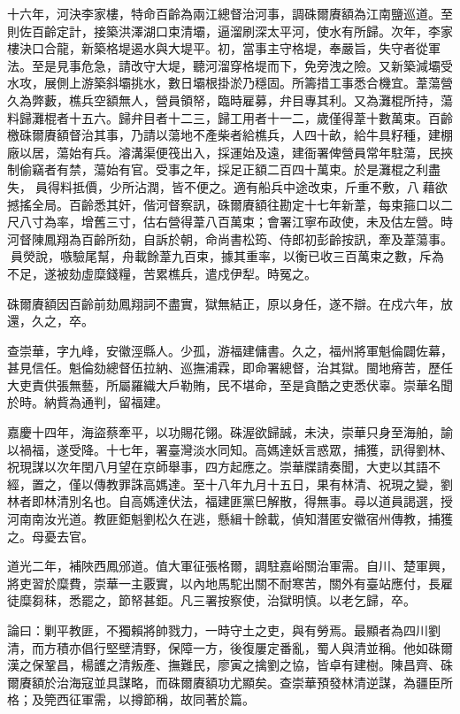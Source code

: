 \begin{pinyinscope}
十六年，河決李家樓，特命百齡為兩江總督治河事，調硃爾賡額為江南鹽巡道。至則佐百齡定計，接築洪澤湖口束清壩，逼溜刷深太平河，使水有所歸。次年，李家樓決口合龍，新築格堤遏水與大堤平。初，當事主守格堤，奉嚴旨，失守者從軍法。至是見事危急，請改守大堤，聽河溜穿格堤而下，免旁洩之險。又新築減壩受水攻，展側上游築斜壩挑水，數日壩根掛淤乃穩固。所籌措工事悉合機宜。葦蕩營久為弊藪，樵兵空額無人，營員領帑，臨時雇募，弁目專其利。又為灘棍所持，蕩料歸灘棍者十五六。歸弁目者十二三，歸工用者十一二，歲僅得葦十數萬束。百齡檄硃爾賡額督治其事，乃請以蕩地不產柴者給樵兵，人四十畝，給牛具籽種，建棚廠以居，蕩始有兵。濬溝渠便筏出入，採運始及遠，建衙署俾營員常年駐蕩，民挾制偷竊者有禁，蕩始有官。受事之年，採足正額二百四十萬束。於是灘棍之利盡失，員得料抵價，少所沾潤，皆不便之。適有船兵中途改束，斤重不敷，八藉欲撼搖全局。百齡悉其奸，偕河督察訊，硃爾賡額往勘定十七年新葦，每束箍口以二尺八寸為率，增舊三寸，估右營得葦八百萬束；會署江寧布政使，未及估左營。時河督陳鳳翔為百齡所劾，自訴於朝，命尚書松筠、侍郎初彭齡按訊，牽及葦蕩事。員熒說，嗾驗尾幫，舟載餘葦九百束，據其重率，以衡已收三百萬束之數，斥為不足，遂被劾虛糜錢糧，苦累樵兵，遣戍伊犁。時冤之。

硃爾賡額因百齡前劾鳳翔詞不盡實，獄無結正，原以身任，遂不辯。在戍六年，放還，久之，卒。

查崇華，字九峰，安徽涇縣人。少孤，游福建傭書。久之，福州將軍魁倫闢佐幕，甚見信任。魁倫劾總督伍拉納、巡撫浦霖，即命署總督，治其獄。閩地瘠苦，歷任大吏責供張無藝，所屬羅織大戶勒賄，民不堪命，至是貪酷之吏悉伏辜。崇華名聞於時。納貲為通判，留福建。

嘉慶十四年，海盜蔡牽平，以功賜花翎。硃渥欲歸誠，未決，崇華只身至海舶，諭以禍福，遂受降。十七年，署臺灣淡水同知。高媽達妖言惑眾，捕獲，訊得劉林、祝現謀以次年閏八月望在京師舉事，四方起應之。崇華牒請奏聞，大吏以其語不經，置之，僅以傳教罪誅高媽達。至十八年九月十五日，果有林清、祝現之變，劉林者即林清別名也。自高媽達伏法，福建匪黨巳解散，得無事。尋以道員謁選，授河南南汝光道。教匪鉅魁劉松久在逃，懸緝十餘載，偵知潛匿安徽宿州傳教，捕獲之。母憂去官。

道光二年，補陜西鳳邠道。值大軍征張格爾，調駐嘉峪關治軍需。自川、楚軍興，將吏習於糜費，崇華一主覈實，以內地馬駝出關不耐寒苦，關外有臺站應付，長雇徒糜芻秣，悉罷之，節帑甚鉅。凡三署按察使，治獄明慎。以老乞歸，卒。

論曰：剿平教匪，不獨賴將帥戮力，一時守土之吏，與有勞焉。最顯者為四川劉清，而方積亦倡行堅壁清野，保障一方，後復屢定番亂，蜀人與清並稱。他如硃爾漢之保鞏昌，楊頀之清叛產、撫難民，廖寅之擒劉之協，皆卓有建樹。陳昌齊、硃爾賡額於治海寇並具謀略，而硃爾賡額功尤顯矣。查崇華預發林清逆謀，為疆臣所格；及筦西征軍需，以撙節稱，故同著於篇。


\end{pinyinscope}